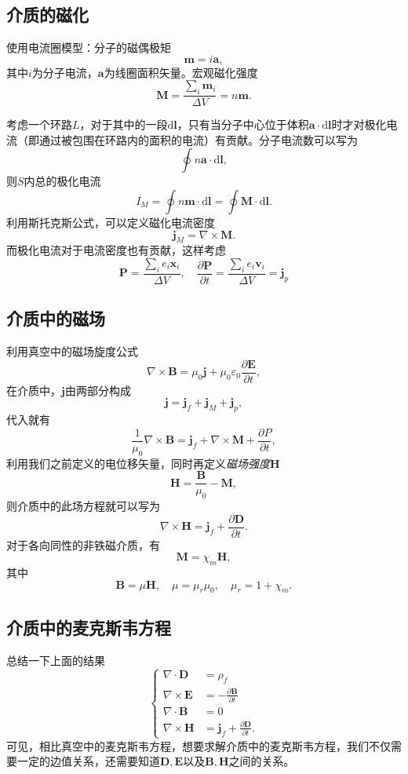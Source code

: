 \documentclass[UTF8]{ctexbook}
\renewcommand{\d}{\mathrm{d}}
\renewcommand{\b}{\boldsymbol}
\numberwithin{equation}{chapter}
\begin{document}
	\subsection{介质的磁化}
	使用电流圈模型：分子的磁偶极矩
	\[\b{m}=i\b{a},\]
	其中$i$为分子电流，$\b{a}$为线圈面积矢量。宏观磁化强度
	\[\b{M}=\frac{\sum_i\b{m}_i}{\Delta V}=n\b{m}.\]
	
	考虑一个环路$L$，对于其中的一段$\d \b{l}$，只有当分子中心位于体积$\b{a}\cdot\d\b{l}$时才对极化电流（即通过被包围在环路内的面积的电流）有贡献。分子电流数可以写为
	\[\oint n\b{a}\cdot\d\b{l},\]
	则$S$内总的极化电流
	\[I_M=\oint n\b{m}\cdot\d\b{l}=\oint \b{M}\cdot\d\b{l}.\]
	利用斯托克斯公式，可以定义磁化电流密度
	\[\b{j}_M=\nabla\times\b{M}.\]
	而极化电流对于电流密度也有贡献，这样考虑
	\[\b{P}=\frac{\sum_i e_i\b{x}_i}{\Delta V},\quad \frac{\partial \b{P}}{\partial t}=\frac{\sum_i e_i\b{v}_i}{\Delta V}=\b{j}_p\]
	
	\subsection{介质中的磁场}
	利用真空中的磁场旋度公式
	\[\nabla\times \b{B}=\mu_0\b{j}+\mu_0\varepsilon_0\frac{\partial \b{E}}{\partial t},\]
	在介质中，$\b{j}$由两部分构成
	\[\b{j}=\b{j}_f+\b{j}_M+\b{j}_p,\]
	代入就有
	\[\frac{1}{\mu_0}\nabla\times\b{B}=\b{j}_f+\nabla\times\b{M}+\frac{\partial P}{\partial t},\]
	利用我们之前定义的电位移矢量，同时再定义\emph{磁场强度}$\b{H}$
	\[\b{H}=\frac{\b{B}}{\mu_0}-\b{M},\]
	则介质中的此场方程就可以写为
	\[\nabla\times\b{H}=\b{j}_f+\frac{\partial \b{D}}{\partial t}.\]
	对于各向同性的非铁磁介质，有
	\[\b{M}=\chi_m\b{H},\]
	其中
	\[\b{B}=\mu\b{H},\quad \mu=\mu_r\mu_0,\quad \mu_r=1+\chi_m.\]
	
	\subsection{介质中的麦克斯韦方程}
	总结一下上面的结果
	\[\left\{\begin{aligned}
		\nabla\cdot\b{D}&=\rho_f \\
		\nabla\times\b{E}&=-\frac{\partial \b{B}}{\partial t} \\
		\nabla\cdot\b{B}&=0 \\
		\nabla\times\b{H}&=\b{j}_f+\frac{\partial \b{D}}{\partial t}.
	\end{aligned}
	\right.
	\]
	可见，相比真空中的麦克斯韦方程，想要求解介质中的麦克斯韦方程，我们不仅需要一定的边值关系，还需要知道$\b{D},\b{E}$以及$\b{B},\b{H}$之间的关系。
	
\end{document}
